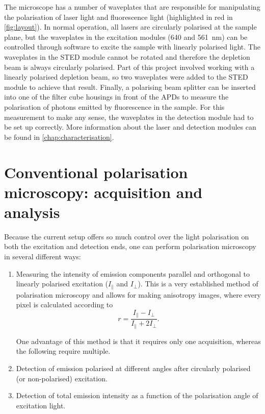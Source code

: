 The microscope has a number of waveplates that are responsible for manipulating the polarisation of laser light and fluorescence light (highlighted in red in \autoref{fig:layout}). In normal operation, all lasers are circularly polarised at the sample plane, but the waveplates in the excitation modules (640 and 561~nm) can be controlled through software to excite the sample with linearly polarised light. The waveplates in the STED module cannot be rotated and therefore the depletion beam is always circularly polarised. Part of this project involved working with a linearly polarised depletion beam, so two waveplates were added to the STED module to achieve that result. Finally, a polarising beam splitter can be inserted into one of the filter cube housings in front of the APDs to measure the polarisation of photons emitted by fluorescence in the sample. For this measurement to make any sense, the waveplates in the detection module had to be set up correctly. More information about the laser and detection modules can be found in \autoref{chap:characterisation}.

\section{Conventional polarisation microscopy: acquisition and analysis}
\label{sec:pol analysis}
 
Because the current setup offers so much control over the light polarisation on both the excitation and detection ends, one can perform polarisation microscopy in several different ways:
\begin{enumerate}
	\item Measuring the intensity of emission components parallel and orthogonal to linearly polarised excitation ($ I_\parallel $ and $ I_\perp $). This is a very established method of polarisation microscopy and allows for making anisotropy images, where every pixel is calculated according to
	\begin{equation}
		r=\frac{I_\parallel - I_\perp}{I_\parallel + 2I_\perp}.
	\end{equation}
	
	One advantage of this method is that it requires only one acquisition, whereas the following require multiple.
	
	\item Detection of emission polarised at different angles after circularly polarised (or non-polarised) excitation.
	
	\item Detection of total emission intensity as a function of the polarisation angle of excitation light.
\end{enumerate}

